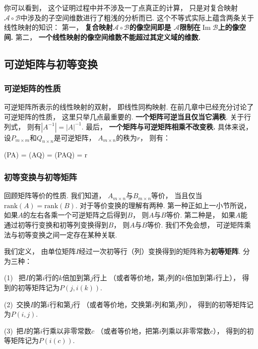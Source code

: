 你可以看到，
这个证明过程中并不涉及一丁点真正的计算，
只是对复合映射$\mathcal{A} \circ \mathcal{B}$中涉及的子空间维数进行了粗浅的分析而已.
这个不等式实际上蕴含两条关于线性映射的知识：
第一，
\textbf{复合映射$\mathcal{A} \circ \mathcal{B}$的像空间即是
$\mathcal{A}$限制在$\operatorname{Im}\mathcal{B}$上的像空间.}
第二，
\textbf{一个线性映射的像空间维数不能超过其定义域的维数.}



\subsection{可逆矩阵与初等变换}

\subsubsection{可逆矩阵的性质}

可逆矩阵所表示的线性映射的双射，
即线性同构映射.
在前几章中已经充分讨论了可逆矩阵的性质，
这里只举几点最重要的.
\textbf{一个矩阵可逆当且仅当它满秩}.
关于行列式，
则有$|A^{-1}| = |A|^{-1}$.
最后，
\textbf{一个矩阵与可逆矩阵相乘不改变秩.}
具体来说，
设$P_{m \times m}$和$Q_{n \times n}$是可逆矩阵，
$A_{m \times n}$的秩为$r$，
则有：
\begin{eq1}
    (PA) = (AQ) =  (PAQ) = r
\end{eq1}


\subsubsection{初等变换与初等矩阵}

回顾矩阵等价的性质.
我们知道，
$A_{m \times n}$与$B_{m \times n}$等价，
当且仅当$\mathrm{rank}(A) = \mathrm{rank}(B)$.
对于等价变换的理解有两种.
第一种正如上一小节所说，
如果$A$的左右各乘一个可逆矩阵之后得到$B$，
则$A$与$B$等价.
第二种是，
如果$A$能通过初等行变换和初等列变换得到$B$，
则$A$与$B$等价.
我们不免会想，
可逆矩阵乘法与初等变换之间一定存在某种关联.

我们定义，
由单位矩阵$I$经过一次初等行（列）变换得到的矩阵称为\textbf{初等矩阵}.
分为三种：
\medskip

(1)~
把$I$的第$i$行的$k$倍加到第$j$行上
（或者等价地，第$j$列的$k$倍加到第$i$行上），
得到的初等矩阵记为$P(j,i(k))$.

(2)~交换$I$的第$i$行和第$j$行
（或者等价地，交换第$i$列和第$j$列），
得到的初等矩阵记为$P(i,j)$.

(3)~把$I$的第$i$行乘以非零常数$c$
（或者等价地，把第$i$列乘以非零常数$c$），
得到的初等矩阵记为$P(i(c))$.

